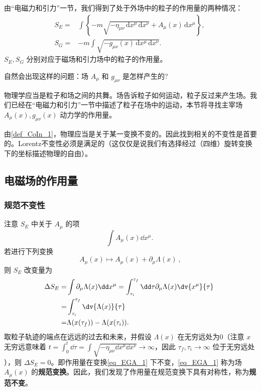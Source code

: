 

由“电磁力和引力”一节，我们得到了处于外场中的粒子的作用量的两种情况：
\begin{equation}
\begin{aligned}
S_E=&\int \left\{-m\sqrt{-\eta_{\mu\nu} \,\mathrm{d}{x} ^\mu \,\mathrm{d}{x} ^\nu}+A_\mu(x) \,\mathrm{d}{x} ^\mu \right\} ,\\
S_G=&-m\int\sqrt{-g_{\mu\nu}(x) \,\mathrm{d}{x} ^\mu \,\mathrm{d}{x} ^\nu}.
\end{aligned}~
\end{equation}
 $S_E,S_G$ 分别对应于磁场和引力场中的粒子的作用量。

自然会出现这样的问题：场 $A_\mu$ 和 $g_{\mu\nu}$ 是怎样产生的?

物理学应当是粒子和场之间的共舞。场告诉粒子如何运动，粒子反过来产生场。我们已经在“电磁力和引力”一节中描述了粒子在场中的运动，本节将寻找主宰场 $A_\mu(x),g_{\mu\nu}(x)$ 动力学的作用量。

由\autoref{def_CoIn_1}，物理应当是关于某一变换不变的。因此找到相关的不变性是首要的。Lorentz不变性必须是满足的（这仅仅是说我们有选择经过（四维）旋转变换下的坐标描述物理的自由）。


\subsection{电磁场的作用量}
\subsubsection{规范不变性}
注意 $S_E$ 中关于 $A_\mu$ 的项
\begin{equation}
\int A_\mu(x) \dd x^\mu.~ 
\end{equation}
若进行下列变换
\begin{equation}\label{eq_EGA_1}
A_\mu(x)\mapsto A_\mu(x)+\partial_\mu\Lambda(x)~,
\end{equation}
则 $S_E$ 改变量为
\begin{equation}
\begin{aligned}
\Delta S_E=&\int\partial_\mu\Lambda(x)\dd x^\mu=\int_{\tau_i}^{\tau_f}\dd \tau\partial_\mu\Lambda(x)\dv{x^\mu}{\tau}\\
=&\int_{\tau_i}^{\tau_f}\dv{\Lambda(x)}{\tau}\\
=&\Lambda(x(\tau_f))-\Lambda(x(\tau_i)).
\end{aligned}~
\end{equation}
取粒子轨迹的端点在远远的过去和未来，并假设 $\Lambda(x)$ 在无穷远处为0（注意 $x$ 无穷远意味着 $t=\int_0^t\dd\tau=\int\sqrt{-\eta_{\mu\nu}\dd x^\mu \dd x^\nu}\rightarrow\infty$，因此 $\tau_f,\tau_i\rightarrow\infty$ 位于无穷远处 ），则 $\Delta S_E=0$。即作用量在变换\autoref{eq_EGA_1} 下不变，\autoref{eq_EGA_1} 称为场 $A_\mu(x)$ 的\textbf{规范变换}。因此，我们发现了作用量在规范变换下具有对称性，称为\textbf{规范不变}。

